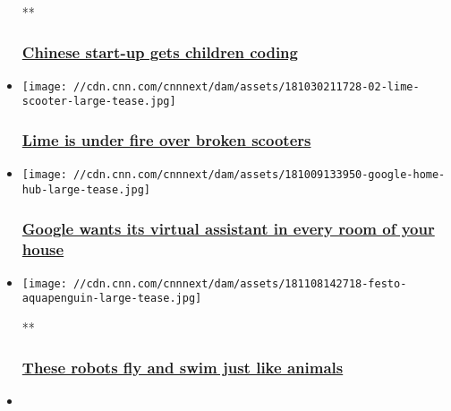 \begin{itemize}
  **

  \hypertarget{chinese-start-up-gets-children-coding}{%
  \subsubsection{\texorpdfstring{\href{/videos/business/2018/11/26/shenzhen-china-makeblock.cnn-business}{Chinese
  start-up gets children
  coding}}{Chinese start-up gets children coding}}\label{chinese-start-up-gets-children-coding}}
\item
  \href{/2018/11/16/tech/lime-scooter-supplier/index.html}{}

  \texttt{[image: //cdn.cnn.com/cnnnext/dam/assets/181030211728-02-lime-scooter-large-tease.jpg]}

  \hypertarget{lime-is-under-fire-over-broken-scooters}{%
  \subsubsection{\texorpdfstring{\href{/2018/11/16/tech/lime-scooter-supplier/index.html}{Lime
  is under fire over broken
  scooters}}{Lime is under fire over broken scooters}}\label{lime-is-under-fire-over-broken-scooters}}
\item
  \href{/2018/11/14/tech/google-demo-home/index.html}{}

  \texttt{[image: //cdn.cnn.com/cnnnext/dam/assets/181009133950-google-home-hub-large-tease.jpg]}

  \hypertarget{google-wants-its-virtual-assistant-in-every-room-of-your-house}{%
  \subsubsection{\texorpdfstring{\href{/2018/11/14/tech/google-demo-home/index.html}{Google
  wants its virtual assistant in every room of your
  house}}{Google wants its virtual assistant in every room of your house}}\label{google-wants-its-virtual-assistant-in-every-room-of-your-house}}
\item
  \href{/videos/business/2018/11/08/festo-animal-robots-orig.cnn-business}{}

  \texttt{[image: //cdn.cnn.com/cnnnext/dam/assets/181108142718-festo-aquapenguin-large-tease.jpg]}

  **

  \hypertarget{these-robots-fly-and-swim-just-like-animals}{%
  \subsubsection{\texorpdfstring{\href{/videos/business/2018/11/08/festo-animal-robots-orig.cnn-business}{These
  robots fly and swim just like
  animals}}{These robots fly and swim just like animals}}\label{these-robots-fly-and-swim-just-like-animals}}
\item
\end{itemize}

